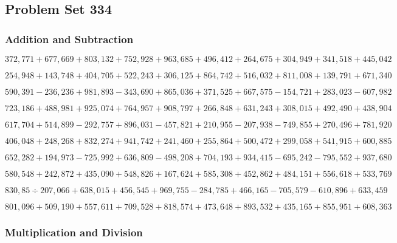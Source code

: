 \hypertarget{problem-set-334}{%
\subsection{Problem Set 334}\label{problem-set-334}}

\hypertarget{addition-and-subtraction}{%
\subsubsection{Addition and
Subtraction}\label{addition-and-subtraction}}

\(372,771+677,669+803,132+752,928+963,685+496,412+264,675+304,949+341,518+445,042\)

\(254,948+143,748+404,705+522,243+306,125+864,742+516,032+811,008+139,791+671,340\)

\(590,391-236,236+981,893-343,690+865,036+371,525+667,575-154,721+283,023-607,982\)

\(723,186+488,981+925,074+764,957+908,797+266,848+631,243+308,015+492,490+438,904\)

\(617,704+514,899-292,757+896,031-457,821+210,955-207,938-749,855+270,496+781,920\)

\(406,048+248,268+832,274+941,742+241,460+255,864+500,472+299,058+541,915+600,885\)

\(652,282+194,973-725,992+636,809-498,208+704,193+934,415-695,242-795,552+937,680\)

\(580,548+242,872+435,090+548,826+167,624+585,308+452,862+484,151+556,618+533,769\)

\(830,85÷207,066+638,015+456,545+969,755-284,785+466,165-705,579-610,896+633,459\)

\(801,096+509,190+557,611+709,528+818,574+473,648+893,532+435,165+855,951+608,363\)

\hypertarget{multiplication-and-division}{%
\subsubsection{Multiplication and
Division}\label{multiplication-and-division}}

